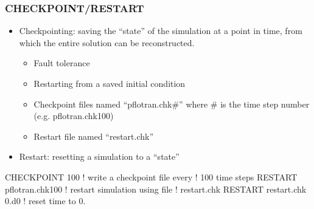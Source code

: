 \documentclass{beamer}
\newcommand\redcomment[1]{{{\color{red} #1}}}
\newcommand\bluecomment[1]{{{\color{blue} #1}}}
\begin{document}
\begin{frame}[fragile]\frametitle{\bf CHECKPOINT/RESTART}

\begin{itemize}
\item Checkpointing: saving the ``state'' of the simulation at a point in time, from which the entire solution can be reconstructed.
  \begin{itemize}
    \item Fault tolerance
    \item Restarting from a saved initial condition
    \item Checkpoint files named ``pflotran.chk\#'' where \# is the time step number (e.g. pflotran.chk100)
    \item Restart file named ``restart.chk''
  \end{itemize}
\item Restart: resetting a simulation to a ``state''
\end{itemize}


\begin{semiverbatim}

CHECKPOINT 100          \bluecomment{! write a checkpoint file every}
                        \bluecomment{!   100 time steps}
RESTART pflotran.chk100 \bluecomment{! restart simulation using file}
                        \bluecomment{!   \redcomment{restart.chk}}
RESTART restart.chk \redcomment{0.d0}  \bluecomment{! reset time to 0.}
\end{semiverbatim}

\end{frame}
\end{document}
